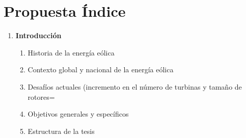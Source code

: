 \section*{Propuesta Índice}


\begin{enumerate}
  \item \textbf{Introducción}
  \begin{enumerate}[label*=\arabic*.]
    \item Historia de la energía eólica
    \item Contexto global y nacional de la energía eólica
    \item Desafíos actuales (incremento en el número de turbinas y tamaño de rotores=
    \item Objetivos generales y específicos
    \item Estructura de la tesis
  \end{enumerate}


\end{enumerate}

